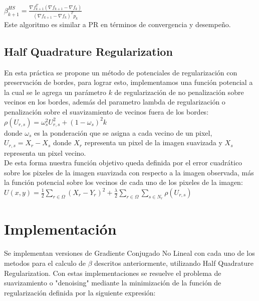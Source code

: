 \documentclass[10pt,journal,compsoc]{styles/IEEEtran}
\begin{document}
$\beta_{k+1}^{HS}=\frac{\nabla f_{k+1}^T (\nabla f_{k+1}- \nabla f_{k})}{(\nabla f_{k+1}- \nabla f_{k})^T p_k}$\\

Este algoritmo es similar a PR en términos de convergencia y desempeño.\\

\subsection{Half Quadrature Regularization}

En esta pr\'actica se propone un método de potenciales de regularizaci\'on con preservación de bordes, para lograr esto, implementamos una función potencial a la cual se le agrega un parámetro $k$ de regularizaci\'on de no penalizaci\'on sobre vecinos en los bordes, además del parametro lambda de regularizaci\'on o penalizaci\'on sobre el suavizamiento de vecinos fuera de los bordes:\\

$\rho(U_{r,s})=\omega_s^2 U_{r,s}^2+(1-\omega_s)^2 k$\\

donde $\omega_s$ es la ponderación que se asigna a cada vecino de un pixel, $U_{r,s}=X_r-X_s$ donde $X_r$ representa un pixel de la imagen suavizada y $X_s$ representa un pixel vecino.\\

De esta forma nuestra función objetivo queda definida por el error cuadrático sobre los pixeles de la imagen suavizada con respecto a la imagen observada, m\'as la función potencial sobre los vecinos de cada uno de los pixeles de la imagen:\\

$U(x,y)=\frac{1}{2}\sum\limits_{r \in \Omega}(X_r-Y_r)^2+\frac{\lambda}{2} \sum\limits_{r \in \Omega} \sum\limits_{s \in N_r}\rho(U_{r,s})$\\

\section{Implementaci\'on}

Se implementan versiones de Gradiente Conjugado No Lineal con cada uno de los metodos para el calculo de $\beta$ descritos anteriormente, utilizando Half Quadrature Regularization. Con estas implementaciones se resuelve el problema de suavizamiento o "denoising" mediante la minimización de la función de regularizaci\'on definida por la siguiente expresión:\\
\end{document}
